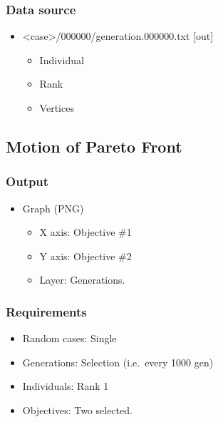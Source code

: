 \documentclass[]{article}
\begin{document}
\subsubsection{Data source}\label{data-source-1}

\begin{itemize}
\itemsep1pt\parskip0pt
\item
  \textless{}case\textgreater{}/000000/generation.000000.txt {[}out{]}

  \begin{itemize}
  \itemsep1pt\parskip0pt
  \item
    Individual
  \item
    Rank
  \item
    Vertices
  \end{itemize}
\end{itemize}

\subsection{Motion of Pareto Front}\label{motion-of-pareto-front}

\subsubsection{Output}\label{output-2}

\begin{itemize}
\itemsep1pt\parskip0pt
\item
  Graph (PNG)

  \begin{itemize}
  \itemsep1pt\parskip0pt
  \item
    X axis: Objective \#1
  \item
    Y axis: Objective \#2
  \item
    Layer: Generations.
  \end{itemize}
\end{itemize}

\subsubsection{Requirements}\label{requirements-2}

\begin{itemize}
\itemsep1pt\parskip0pt
\item
  Random cases: Single
\item
  Generations: Selection (i.e.~every 1000 gen)
\item
  Individuals: Rank 1
\item
  Objectives: Two selected.
\end{itemize}
\end{document}
